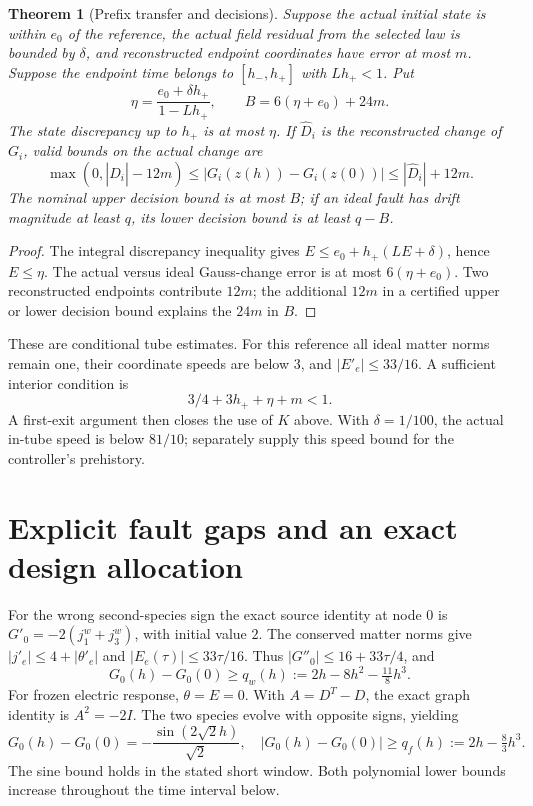 \documentclass[10pt,a4paper]{article}
\newtheorem{theorem}{Theorem}
\begin{document}
\begin{theorem}[Prefix transfer and decisions]
Suppose the actual initial state is within $e_0$ of the reference, the actual field residual from the selected law is bounded by $\delta$, and reconstructed endpoint coordinates have error at most $m$. Suppose the endpoint time belongs to $[h_-,h_+]$ with $Lh_+<1$. Put
\begin{equation}
\eta=\frac{e_0+\delta h_+}{1-Lh_+},\qquad
B=6(\eta+e_0)+24m .
\end{equation}
The state discrepancy up to $h_+$ is at most $\eta$. If $\widehat D_i$ is the reconstructed change of $G_i$, valid bounds on the actual change are
\begin{equation}
\max(0,|\widehat D_i|-12m)\leq
|G_i(z(h))-G_i(z(0))|\leq|\widehat D_i|+12m.
\end{equation}
The nominal upper decision bound is at most $B$; if an ideal fault has drift magnitude at least $q$, its lower decision bound is at least $q-B$.
\end{theorem}
\begin{proof}
The integral discrepancy inequality gives $E\leq e_0+h_+(LE+\delta)$, hence $E\leq\eta$. The actual versus ideal Gauss-change error is at most $6(\eta+e_0)$. Two reconstructed endpoints contribute $12m$; the additional $12m$ in a certified upper or lower decision bound explains the $24m$ in $B$.
\end{proof}
These are conditional tube estimates. For this reference all ideal matter norms remain one, their coordinate speeds are below $3$, and $|E'_e|\leq33/16$. A sufficient interior condition is
\begin{equation}
3/4+3h_++\eta+m<1.
\end{equation}
A first-exit argument then closes the use of $K$ above. With $\delta=1/100$, the actual in-tube speed is below $81/10$; separately supply this speed bound for the controller's prehistory.
\newpage
\section{Explicit fault gaps and an exact design allocation}
For the wrong second-species sign the exact source identity at node $0$ is
$G'_0=-2(j^w_1+j^w_3)$, with initial value $2$.
The conserved matter norms give $|j'_e|\leq4+|\theta'_e|$ and $|E_e(\tau)|\leq33\tau/16$. Thus
$|G''_0|\leq16+33\tau/4$, and
\begin{equation}
G_0(h)-G_0(0)\geq q_w(h):=2h-8h^2-\tfrac{11}{8}h^3.
\end{equation}
For frozen electric response, $\theta=E=0$. With $A=D^T-D$, the exact graph identity is $A^2=-2I$. The two species evolve with opposite signs, yielding
\begin{equation}
G_0(h)-G_0(0)=-\frac{\sin(2\sqrt2h)}{\sqrt2},
\quad |G_0(h)-G_0(0)|\geq q_f(h):=2h-\tfrac83h^3.
\end{equation}
The sine bound holds in the stated short window. Both polynomial lower bounds increase throughout the time interval below.
\end{document}
